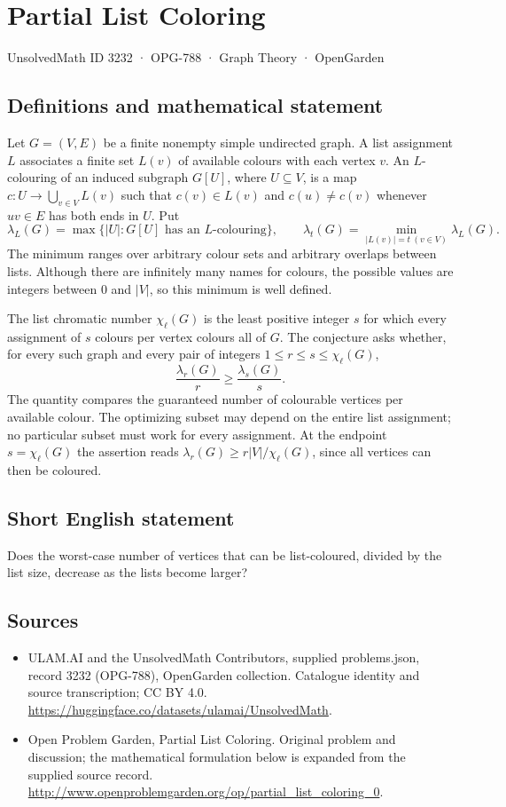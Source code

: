 \documentclass[11pt,a4paper]{article}
\begin{document}
\section*{Partial List Coloring}\label{3232}
{\small UnsolvedMath ID 3232 · OPG-788 · Graph Theory · OpenGarden}
\subsection{Definitions and mathematical statement}
Let $G=(V,E)$ be a finite nonempty simple undirected graph. A list assignment
$L$ associates a finite set $L(v)$ of available colours with each vertex $v$.
An $L$-colouring of an induced subgraph $G[U]$, where $U\subseteq V$, is a
map $c:U\to\bigcup_{v\in V}L(v)$ such that $c(v)\in L(v)$ and
$c(u)\ne c(v)$ whenever $uv\in E$ has both ends in $U$. Put
\[
 \lambda_L(G)=\max\{|U|:G[U]\text{ has an }L\text{-colouring}\},
 \qquad
 \lambda_t(G)=\min_{|L(v)|=t\ (v\in V)}\lambda_L(G).
\]
The minimum ranges over arbitrary colour sets and arbitrary overlaps between
lists. Although there are infinitely many names for colours, the possible
values are integers between $0$ and $|V|$, so this minimum is well defined.

The list chromatic number $\chi_\ell(G)$ is the least positive integer $s$
for which every assignment of $s$ colours per vertex colours all of $G$.
The conjecture asks whether, for every such graph and every pair of integers
$1\le r\le s\le\chi_\ell(G)$,
\[
                 \frac{\lambda_r(G)}r\ge\frac{\lambda_s(G)}s.
\]
The quantity compares the guaranteed number of colourable vertices per
available colour. The optimizing subset may depend on the entire list
assignment; no particular subset must work for every assignment. At the
endpoint $s=\chi_\ell(G)$ the assertion reads
$\lambda_r(G)\ge r|V|/\chi_\ell(G)$, since all vertices can then be coloured.
\subsection{Short English statement}
Does the worst-case number of vertices that can be list-coloured, divided by the list size, decrease as the lists become larger?
\subsection{Sources}
\begin{itemize}
\item[S1] ULAM.AI and the UnsolvedMath Contributors, supplied problems.json, record 3232 (OPG-788), OpenGarden collection. Catalogue identity and source transcription; CC BY 4.0.
\url{https://huggingface.co/datasets/ulamai/UnsolvedMath}.
\item[S2] Open Problem Garden, Partial List Coloring. Original problem and discussion; the mathematical formulation below is expanded from the supplied source record.
\url{http://www.openproblemgarden.org/op/partial_list_coloring_0}.
\end{itemize}
\end{document}
